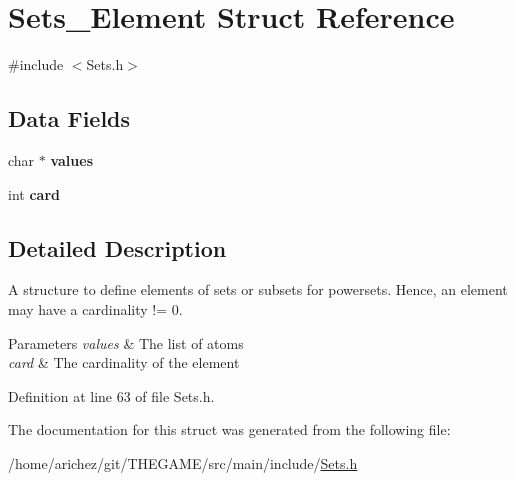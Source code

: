 \hypertarget{struct_sets___element}{\section{Sets\-\_\-\-Element Struct Reference}
\label{struct_sets___element}
}


{\ttfamily \#include $<$Sets.\-h$>$}

\subsection*{Data Fields}
\begin{DoxyCompactItemize}
\item 
\hypertarget{struct_sets___element_ae0a6707762d7508ab3f46a732a4dd8ac}{char $\ast$ {\bfseries values}}\label{struct_sets___element_ae0a6707762d7508ab3f46a732a4dd8ac}

\item 
\hypertarget{struct_sets___element_acd789e381a684163a021e2d228653afd}{int {\bfseries card}}\label{struct_sets___element_acd789e381a684163a021e2d228653afd}

\end{DoxyCompactItemize}


\subsection{Detailed Description}
A structure to define elements of sets or subsets for powersets. Hence, an element may have a cardinality != 0. 
\begin{DoxyParams}{Parameters}
{\em values} & The list of atoms \\
\hline
{\em card} & The cardinality of the element \\
\hline
\end{DoxyParams}


Definition at line 63 of file Sets.\-h.



The documentation for this struct was generated from the following file\-:\begin{DoxyCompactItemize}
\item 
/home/arichez/git/\-T\-H\-E\-G\-A\-M\-E/src/main/include/\hyperlink{_sets_8h}{Sets.\-h}\end{DoxyCompactItemize}

